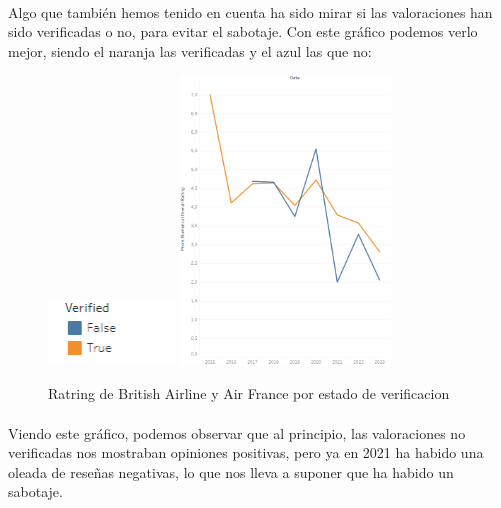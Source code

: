 \documentclass{report}
\begin{document}
            \paragraph*{}{
            Algo que también hemos tenido en cuenta ha sido mirar si las valoraciones han sido verificadas o no, para evitar el sabotaje. Con este gráfico podemos verlo mejor, siendo el naranja las verificadas y el azul las que no:
            }
            \begin{figure}[H]
                \centering
                \includegraphics[width=0.3\textwidth]{img/Guion4.png}
                \includegraphics[width=0.5\textwidth]{img/Verified.png}
                \caption{Ratring de British Airline y Air France por estado de verificacion}
            \end{figure}
            

            
            \paragraph*{}{
            Viendo este gráfico, podemos observar que al principio, las valoraciones no verificadas nos mostraban opiniones positivas, pero ya en 2021 ha habido una oleada de reseñas negativas, lo que nos lleva a suponer que ha habido un sabotaje.
            }
\end{document}
